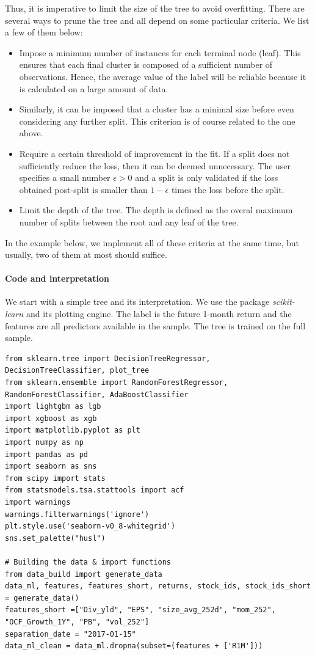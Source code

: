 Thus, it is imperative to limit the size of the tree to avoid overfitting. There are several ways to prune the tree and all depend on some particular criteria. We list a few of them below:

\begin{itemize}
\item Impose a minimum number of instances for each terminal node (leaf). This ensures that each final cluster is composed of a sufficient number of observations. Hence, the average value of the label will be reliable because it is calculated on a large amount of data.
\item Similarly, it can be imposed that a cluster has a minimal size before even considering any further split. This criterion is of course related to the one above.
\item Require a certain threshold of improvement in the fit. If a split does not sufficiently reduce the loss, then it can be deemed unnecessary. The user specifies a small number $\epsilon>0$ and a split is only validated if the loss obtained post-split is smaller than $1 -\epsilon$ times the loss before the split.
\item Limit the depth of the tree. The depth is defined as the overal maximum number of splits between the root and any leaf of the tree.
\end{itemize}

In the example below, we implement all of these criteria at the same time, but usually, two of them at most should suffice.

\paragraph{Code and interpretation}

We start with a simple tree and its interpretation. We use the package \textit{scikit-learn} and its plotting engine. The label is the future 1-month return and the features are all predictors available in the sample. The tree is trained on the full sample.

\begin{verbatim}
from sklearn.tree import DecisionTreeRegressor, DecisionTreeClassifier, plot_tree
from sklearn.ensemble import RandomForestRegressor, RandomForestClassifier, AdaBoostClassifier
import lightgbm as lgb
import xgboost as xgb
import matplotlib.pyplot as plt
import numpy as np
import pandas as pd
import seaborn as sns
from scipy import stats
from statsmodels.tsa.stattools import acf
import warnings
warnings.filterwarnings('ignore')
plt.style.use('seaborn-v0_8-whitegrid')
sns.set_palette("husl")

# Building the data & import functions
from data_build import generate_data
data_ml, features, features_short, returns, stock_ids, stock_ids_short = generate_data()
features_short =["Div_yld", "EPS", "size_avg_252d", "mom_252", "OCF_Growth_1Y", "PB", "vol_252"]
separation_date = "2017-01-15"
data_ml_clean = data_ml.dropna(subset=(features + ['R1M']))
\end{verbatim}


